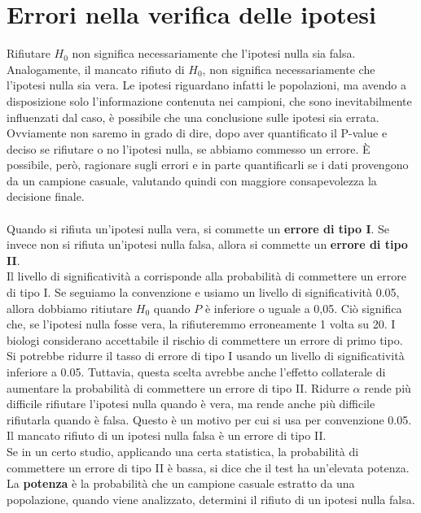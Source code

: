 \documentclass[drafts, 10pt]{book}
\begin{document}
\section{Errori nella verifica delle ipotesi}
Rifiutare $H_0$ non significa necessariamente che l'ipotesi nulla sia falsa. 
\\
Analogamente, il mancato rifiuto di $H_0$, non significa necessariamente che l'ipotesi nulla sia vera. Le ipotesi riguardano infatti le popolazioni, ma avendo a disposizione solo l'informazione contenuta nei campioni, che sono inevitabilmente influenzati dal caso, è possibile che una conclusione sulle ipotesi sia errata. 
\\
Ovviamente non saremo in grado di dire, dopo aver quantificato il P-value e deciso se rifiutare o no l'ipotesi nulla, se abbiamo commesso un errore. È possibile, però, ragionare sugli errori e in parte quantificarli se i dati provengono da un campione casuale, valutando quindi con maggiore consapevolezza la decisione finale. 
\\
\\
Quando si rifiuta un'ipotesi nulla vera, si commette un \textbf{errore di tipo I}. Se invece non si rifiuta un'ipotesi nulla falsa, allora si commette un \textbf{errore di tipo II}. 
\\
Il livello di significatività a corrisponde alla probabilità di commettere un errore di tipo I. Se seguiamo la convenzione e usiamo un livello di significatività 0.05, allora dobbiamo ritiutare $H_0$ quando $P$ è inferiore o uguale a 0,05. Ciò significa che, se l'ipotesi nulla fosse vera, la rifiuteremmo erroneamente 1 volta su 20. I biologi considerano accettabile il rischio di commettere un errore di primo tipo. 
\\
Si potrebbe ridurre il tasso di errore di tipo I usando un livello di significatività inferiore a 0.05. Tuttavia, questa scelta avrebbe anche l'effetto collaterale di aumentare la probabilità di commettere un errore di tipo II. Ridurre $\alpha$ rende più difficile rifiutare l'ipotesi nulla quando è vera, ma rende anche più difficile rifiutarla quando è falsa. Questo è un motivo per cui si usa per convenzione 0.05.
\\
Il mancato rifiuto di un ipotesi nulla falsa è un errore di tipo II.
\\
Se in un certo studio, applicando una certa statistica, la probabilità di commettere un errore di tipo II è bassa, si dice che il test ha un'elevata potenza. La \textbf{potenza} è la probabilità che un campione casuale estratto da una popolazione, quando viene analizzato, determini il rifiuto di un ipotesi nulla falsa.
\end{document}

